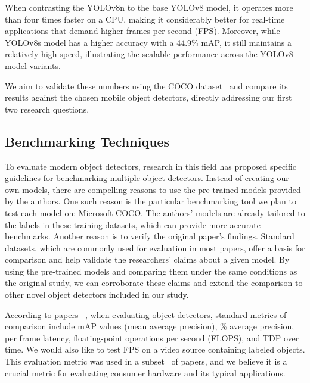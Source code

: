 \documentclass[10pt,twocolumn,letterpaper]{article}
\begin{document}
When contrasting the YOLOv8n to the base YOLOv8 model, it operates more than four times faster on a CPU, making it considerably better for real-time applications that demand higher frames per second (FPS). Moreover, while YOLOv8s model has a higher accuracy with a 44.9\% mAP, it still maintains a relatively high speed, illustrating the scalable performance across the YOLOv8 model variants.

We aim to validate these numbers using the COCO dataset~\cite{lin2015microsoft} and compare its results against the chosen mobile object detectors, directly addressing our first two research questions.

\subsection{Benchmarking Techniques}
\label{subsec:BenchmarkingTechniques}

To evaluate modern object detectors, research in this field\cite{lee2021benchmarking,li2019object} has proposed specific guidelines for benchmarking multiple object detectors. Instead of creating our own models, there are compelling reasons to use the pre-trained models provided by the authors. One such reason is the particular benchmarking tool we plan to test each model on: Microsoft COCO\cite{lin2015microsoft}. The authors’ models are already tailored to the labels in these training datasets, which can provide more accurate benchmarks. Another reason is to verify the original paper's findings. Standard datasets, which are commonly used for evaluation in most papers, offer a basis for comparison and help validate the researchers' claims about a given model. By using the pre-trained models and comparing them under the same conditions as the original study, we can corroborate these claims and extend the comparison to other novel object detectors included in our study.

According to papers ~\cite{lee2021benchmarking,li2019object}, when evaluating object detectors, standard metrics of comparison include mAP values (mean average precision), \% average precision, per frame latency, floating-point operations per second (FLOPS), and TDP over time.
We would also like to test FPS on a video source containing labeled objects.
This evaluation metric was used in a subset~\cite{honegger2014real,liu2019edge,ganesh2022yoloret,mao2016real,ullah2020cpu} of papers, and we believe it is a crucial metric for evaluating consumer hardware and its typical applications.
\end{document}
